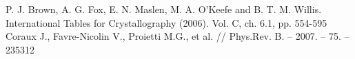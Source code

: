 \begin{thebibliography}{99}

  P. J. Brown, A. G. Fox, E. N. Maslen, M. A. O'Keefe and B. T. M. Willis.
  International Tables for Crystallography (2006). Vol. C, ch. 6.1, pp. 554-595
  Coraux J., Favre-Nicolin V., Proietti M.G., et al. // Phys.Rev. B. – 2007. – 75. – 235312


\end{thebibliography}
